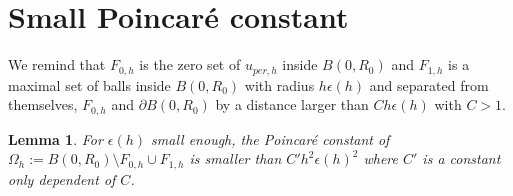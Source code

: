 \documentclass[leqno,11pt,letterpaper, english]{amsart}
\newcommand{\nn}{\nonumber}
\theoremstyle{plain}
\newtheorem{lem}[prop]{Lemma}
\theoremstyle{definition}
\numberwithin{equation}{section}
\def\S{\mathbb S}
\begin{document}
\begin{itemize}

    
\end{itemize}
	
	
\appendix
\section{Small Poincaré constant}
\label{subsect: small_PC}
We remind that $F_{0,h}$ is the zero set of $u_{per,h}$ inside $B(0,R_0)$ and $F_{1,h}$ is a maximal set of balls inside $B(0,R_0)$ with radius $h\epsilon(h)$ and separated from themselves, $F_{0,h}$ and $\partial B(0,R_0)$ by a distance larger than $Ch\epsilon(h)$ with $C>1$. 
	\begin{lem}
		For $\epsilon(h)$ small enough, the Poincaré constant of $\Omega_h:=B(0,R_0)\setminus F_{0,h}\cup F_{1,h}$ is smaller than $C'h^2\epsilon(h)^2$ where $C'$ is a constant only dependent of $C$.
	\end{lem}
	
\end{document}
